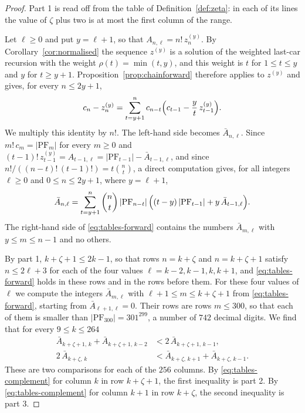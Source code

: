\documentclass{amsart}
\theoremstyle{definition}
\theoremstyle{remark}
\numberwithin{equation}{section}
\begin{document}
\begin{proof}
Part 1 is read off from the table of Definition~\ref{def:zeta}: in each of
its lines the value of $\zeta$ plus two is at most the first column of the
range.

Let $\ell\ge0$ and put $y=\ell+1$, so that $A_{n,\ell}=n!\,z^{(y)}_n$. By
Corollary~\ref{cor:normalised} the sequence $z^{(y)}$ is a solution of the
weighted last-car recursion with the weight $\rho(t)=\min(t,y)$, and this
weight is $t$ for $1\le t\le y$ and $y$ for $t\ge y+1$.
Proposition~\ref{prop:chainforward} therefore applies to $z^{(y)}$ and
gives, for every $n\le2y+1$,
\[
c_n-z^{(y)}_n=\sum_{t=y+1}^{n}c_{n-t}\Bigl(c_{t-1}-\frac yt\,z^{(y)}_{t-1}\Bigr).
\]
We multiply this identity by $n!$. The left-hand side becomes
$\bar A_{n,\ell}$. Since $m!\,c_m=\lvert\mathrm{PF}_m\rvert$ for every
$m\ge0$ and $(t-1)!\,z^{(y)}_{t-1}=A_{t-1,\ell}
=\lvert\mathrm{PF}_{t-1}\rvert-\bar A_{t-1,\ell}$, and since
$n!/((n-t)!\,(t-1)!)=t\binom nt$, a direct computation gives, for all
integers $\ell\ge0$ and $0\le n\le2y+1$, where $y=\ell+1$,
\begin{equation}\label{eq:tables-forward}
\bar A_{n,\ell}=\sum_{t=y+1}^{n}\binom nt\,\lvert\mathrm{PF}_{n-t}\rvert\,
\Bigl((t-y)\,\lvert\mathrm{PF}_{t-1}\rvert+y\,\bar A_{t-1,\ell}\Bigr).
\end{equation}
The right-hand side of \eqref{eq:tables-forward} contains the numbers
$\bar A_{m,\ell}$ with $y\le m\le n-1$ and no others.

By part 1, $k+\zeta+1\le2k-1$, so that rows $n=k+\zeta$ and
$n=k+\zeta+1$ satisfy $n\le2\ell+3$ for each of the four values
$\ell=k-2,k-1,k,k+1$, and \eqref{eq:tables-forward} holds in these rows and
in the rows before them. For these four values of $\ell$ we compute the
integers $\bar A_{m,\ell}$ with $\ell+1\le m\le k+\zeta+1$ from
\eqref{eq:tables-forward}, starting from $\bar A_{\ell+1,\ell}=0$. Their
rows are rows $m\le300$, so that each of them is smaller than
$\lvert\mathrm{PF}_{300}\rvert=301^{299}$, a number of $742$ decimal
digits. We find that for every $9\le k\le264$
\begin{align*}
\bar A_{k+\zeta+1,\,k}+\bar A_{k+\zeta+1,\,k-2}
&<2\,\bar A_{k+\zeta+1,\,k-1},\\
2\,\bar A_{k+\zeta,\,k}
&<\bar A_{k+\zeta,\,k+1}+\bar A_{k+\zeta,\,k-1}.
\end{align*}
These are two comparisons for each of the $256$ columns.
By \eqref{eq:tables-complement} for column $k$ in row $k+\zeta+1$,
the first inequality is part 2. By \eqref{eq:tables-complement} for column
$k+1$ in row $k+\zeta$, the second inequality is part 3.
\end{proof}
\end{document}
